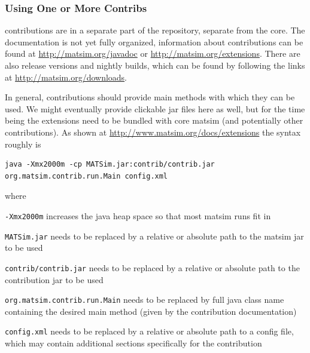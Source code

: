 \subsubsection{Using One or More Contribs}
\label{sec:using-contribs}


\Glspl{contribution} are in a separate part of the repository, separate from the core.  The documentation is not yet fully organized, information about \glspl{contribution} can be found at \url{http://matsim.org/javadoc} or \url{http://matsim.org/extensions}. There are also release versions and nightly builds, which can be found by following the links at %
\url{http://matsim.org/downloads}.

In general, \glspl{contribution} should provide main methods with which they can be used.  We might eventually provide clickable jar files here as well, but for the time being the extensions need to be bundled with core \gls{matsim} (and potentially other \glspl{contribution}). As shown at \url{http://www.matsim.org/docs/extensions} the syntax roughly is
\begin{lstlisting}
java -Xmx2000m -cp MATSim.jar:contrib/contrib.jar org.matsim.contrib.run.Main config.xml  
\end{lstlisting}
where
\begin{compactitem}
\item \lstinline$-Xmx2000m$ increases the \gls{java} heap space so that most \gls{matsim} runs fit in
\item \lstinline$MATSim.jar$ needs to be replaced by a relative or absolute path to the \gls{matsim} jar to be used
\item \lstinline$contrib/contrib.jar$ needs to be replaced by a relative or absolute path to the \gls{contribution} jar to be used
\item \lstinline$org.matsim.contrib.run.Main$ needs to be replaced by full \gls{java} class name containing the desired main method (given by the \gls{contribution} documentation)
\item \lstinline$config.xml$ needs to be replaced by a relative or absolute path to a config file, which may contain additional sections specifically for the \gls{contribution}
\end{compactitem}

